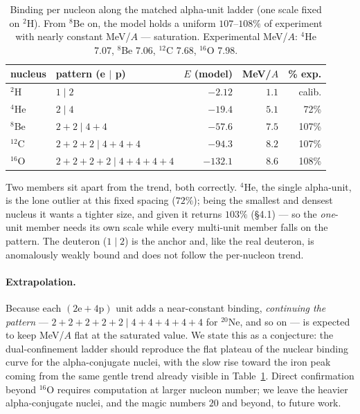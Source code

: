\documentclass[11pt]{article}
\begin{document}
\begin{table}[t]
\centering
\begin{tabular}{llrrr}
\toprule
nucleus & pattern (e $\mid$ p) & $E$ (model) & MeV/$A$ & \% exp.\\
\midrule
$^2$H   & $1\mid 2$                              & $-2.12$ & $1.1$  & calib.\\
$^4$He  & $2\mid 4$                              & $-19.4$ & $5.1$  & 72\%\\
$^8$Be  & $2{+}2\mid 4{+}4$                      & $-57.6$ & $7.5$  & 107\%\\
$^{12}$C& $2{+}2{+}2\mid 4{+}4{+}4$              & $-94.3$ & $8.2$  & 107\%\\
$^{16}$O& $2{+}2{+}2{+}2\mid 4{+}4{+}4{+}4$      & $-132.1$& $8.6$  & 108\%\\
\bottomrule
\end{tabular}
\caption{Binding per nucleon along the matched alpha-unit ladder (one scale fixed on
$^2$H). From $^8$Be on, the model holds a uniform $107$--$108\%$ of experiment with nearly
constant MeV/$A$ --- saturation. Experimental MeV/$A$: $^4$He 7.07, $^8$Be 7.06, $^{12}$C 7.68,
$^{16}$O 7.98.}
\label{tab:perA}
\end{table}

Two members sit apart from the trend, both correctly. $^4$He, the single alpha-unit, is the
lone outlier at this fixed spacing ($72\%$); being the smallest and densest nucleus it wants a
tighter size, and given it returns $103\%$ (\S4.1) --- so the \emph{one}-unit member needs its
own scale while every multi-unit member falls on the pattern. The deuteron ($1\mid2$) is the
anchor and, like the real deuteron, is anomalously weakly bound and does not follow the
per-nucleon trend.

\paragraph{Extrapolation.} Because each $(\mathrm{2e}+\mathrm{4p})$ unit adds a near-constant
binding, \emph{continuing the pattern} --- $2{+}2{+}2{+}2{+}2\mid 4{+}4{+}4{+}4{+}4$ for
$^{20}$Ne, and so on --- is expected to keep MeV/$A$ flat at the saturated value. We state this
as a conjecture: the dual-confinement ladder should reproduce the flat plateau of the nuclear
binding curve for the alpha-conjugate nuclei, with the slow rise toward the iron peak coming
from the same gentle trend already visible in Table~\ref{tab:perA}. Direct confirmation beyond
$^{16}$O requires computation at larger nucleon number; we leave the heavier alpha-conjugate
nuclei, and the magic numbers $20$ and beyond, to future work.
\end{document}
